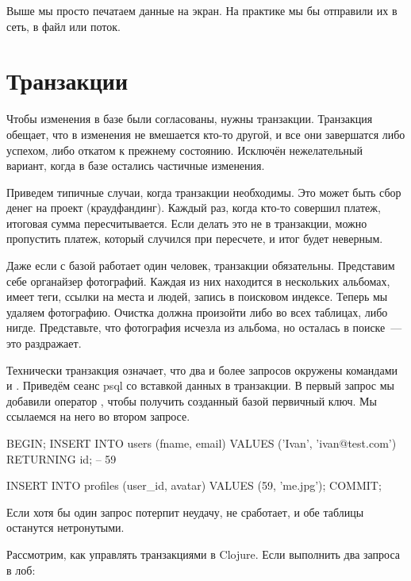 Выше мы просто печатаем данные на экран. На практике мы бы отправили их в сеть, в файл или поток.

\section{Транзакции}


Чтобы изменения в базе были согласованы, нужны транзакции. Транзакция обещает, что в изменения не вмешается кто-то другой, и все они завершатся либо успехом, либо откатом к прежнему состоянию. Исключён нежелательный вариант, когда в базе остались частичные изменения.

Приведем типичные случаи, когда транзакции необходимы. Это может быть сбор денег на проект (краудфандинг). Каждый раз, когда кто-то совершил платеж, итоговая сумма пересчитывается. Если делать это не в транзакции, можно пропустить платеж, который случился при пересчете, и итог будет неверным.

Даже если с базой работает один человек, транзакции обязательны. Представим себе органайзер фотографий. Каждая из них находится в нескольких альбомах, имеет теги, ссылки на места и людей, запись в поисковом индексе. Теперь мы удаляем фотографию. Очистка должна произойти либо во всех таблицах, либо нигде. Представьте, что фотография исчезла из альбома, но осталась в поиске~--- это раздражает.


Технически транзакция означает, что два и более запросов окружены командами  и . Приведём сеанс psql со вставкой данных в транзакции. В первый запрос мы добавили оператор , чтобы получить созданный базой первичный ключ. Мы ссылаемся на него во втором запросе.

\begin{english}
  \begin{sql}
BEGIN;
INSERT INTO users (fname, email)
VALUES ('Ivan', 'ivan@test.com') RETURNING id;
-- 59

INSERT INTO profiles (user_id, avatar)
VALUES (59, 'me.jpg');
COMMIT;
  \end{sql}
\end{english}

Если хотя бы один запрос потерпит неудачу,  не сработает, и обе таблицы останутся нетронутыми.

Рассмотрим, как управлять транзакциями в Clojure. Если выполнить два запроса в лоб:


